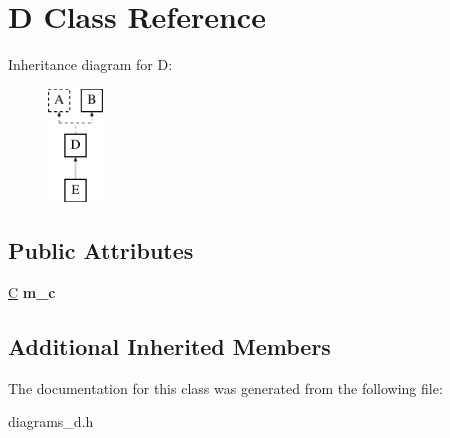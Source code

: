 \hypertarget{class_d}{\section{D Class Reference}
\label{class_d}
}
Inheritance diagram for D\-:\begin{figure}[H]
\begin{center}
\leavevmode
\includegraphics[height=3.000000cm]{class_d}
\end{center}
\end{figure}
\subsection*{Public Attributes}
\begin{DoxyCompactItemize}
\item 
\hypertarget{class_d_a9d877c7aa092f423f2a073f3c62fef9c}{\hyperlink{class_c}{C} {\bfseries m\-\_\-c}}\label{class_d_a9d877c7aa092f423f2a073f3c62fef9c}

\end{DoxyCompactItemize}
\subsection*{Additional Inherited Members}


The documentation for this class was generated from the following file\-:\begin{DoxyCompactItemize}
\item 
diagrams\-\_\-d.\-h\end{DoxyCompactItemize}
